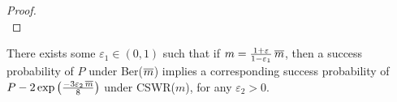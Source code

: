 \begin{proof*}
\begin{proof}
{\begin{equation*}
            \end{equation*}
        }
    \end{proof}
    \qedstep
\end{proof*}

\begin{lemma}
    There exists some $\varepsilon_1 \in (0, 1)$ such that if $m =  \frac{1 + \varepsilon}{1 - \varepsilon_1} \mathop{\overline{m}}$, then a success probability of $P$ under Ber($\mathop{\overline{m}}$) implies a corresponding success probability of $P - 2 \exp \left ( \frac{-3 \varepsilon_2 \mathop{\overline{m}}}{8} \right )$ under CSWR($m$), for any $\varepsilon_2 > 0$.
\end{lemma}

